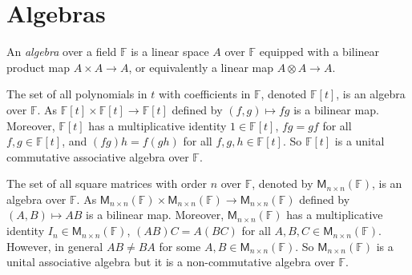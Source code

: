 \documentclass[
	11pt, %
	fleqn, %
	a4paper, %
]{LegrandOrangeBook}
\newcommand{\F}{\mathbb{F}} %
\newcommand{\M}[2]{\mathsf{M}_{#1}(#2)} %
\newcommand{\vequiv}{\rotatebox{90}{$\equiv$}}
\begin{document}
\begin{center}
    \qquad
\end{center}

\newpage

\section{Algebras}

\begin{definition}[Algebras]
    An \emph{algebra} over a field $\F$ is a linear space $A$ over $\F$ equipped with a bilinear product map $A \times A \to A$, or equivalently a linear map $A \otimes A \to A$.
\end{definition}

\begin{example}
    The set of all polynomials in $t$ with coefficients in $\F$, denoted $\F[t]$, is an algebra over $\F$. As $\F[t] \times \F[t] \to \F[t]$ defined by $(f, g) \mapsto fg$ is a bilinear map. Moreover, $\F[t]$ has a multiplicative identity $1 \in \F[t]$, $fg = gf$ for all $f, g \in \F[t]$, and $(fg)h = f(gh)$ for all $f, g, h \in \F[t]$. So $\F[t]$ is a unital commutative associative algebra over $\F$.
\end{example}

\begin{example}
    The set of all square matrices with order $n$ over $\F$, denoted by $\M{n \times n}{\F}$, is an algebra over $\F$. As $\M{n \times n}{\F} \times \M{n \times n}{\F} \to \M{n \times n}{\F}$ defined by $(A, B) \mapsto AB$ is a bilinear map. Moreover, $\M{n \times n}{\F}$ has a multiplicative identity $I_n \in \M{n \times n}{\F}$, $(AB)C = A(BC)$ for all $A, B, C \in \M{n \times n}{\F}$. However, in general $AB \neq BA$ for some $A, B \in \M{n \times n}{\F}$. So $\M{n \times n}{\F}$ is a unital associative algebra but it is a non-commutative algebra over $\F$.
\end{example}
\end{document}
